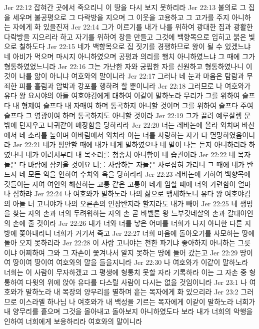 Jer 22:12  잡혀간 곳에서 죽으리니 이 땅을 다시 보지 못하리라
Jer 22:13  불의로 그 집을 세우며 불공평으로 그 다락방을 지으며 그 이웃을 고용하고 그 고가를 주지 아니하는 자에게 화 있을진저
Jer 22:14  그가 이르기를 내가 나를 위하여 광대한 집과 광활한 다락방을 지으리라 하고 자기를 위하여 창을 만들고 그것에 백향목으로 입히고 붉은 빛으로 칠하도다
Jer 22:15  네가 백향목으로 집 짓기를 경쟁하므로 왕이 될 수 있겠느냐 네 아비가 먹으며 마시지 아니하였으며 공평과 의리를 행치 아니하였느냐 그 때에 그가 형통하였었느니라
Jer 22:16  그는 가난한 자와 궁핍한 자를 신원하고 형통하였나니 이것이 나를 앎이 아니냐 여호와의 말이니라
Jer 22:17  그러나 네 눈과 마음은 탐람과 무죄한 피를 흘림과 압박과 강포를 행하려 할 뿐이니라
Jer 22:18  그러므로 나 여호와가 유다 왕 요시야의 아들 여호야김에게 대하여 이같이 말하노라 무리가 그를 위하여 슬프다 내 형제여 슬프다 내 자매여 하며 통곡하지 아니할 것이며 그를 위하여 슬프다 주여 슬프다 그 영광이여 하며 통곡하지도 아니할 것이라
Jer 22:19  그가 끌려 예루살렘 문 밖에 던지우고 나귀같이 매장함을 당하리라
Jer 22:20  너는 레바논에 올라 외치며 바산에서 네 소리를 높이며 아바림에서 외치라 이는 너를 사랑하는 자가 다 멸망하였음이니라
Jer 22:21  네가 평안할 때에 내가 네게 말하였으나 네 말이 나는 듣지 아니하리라 하였나니 네가 어려서부터 내 목소리를 청종치 아니함이 네 습관이라
Jer 22:22  네 목자들은 다 바람에 삼키울 것이요 너를 사랑하는 자들은 사로잡혀 가리니 그 때에 네가 반드시 네 모든 악을 인하여 수치와 욕을 당하리라
Jer 22:23  레바논에 거하여 백향목에 깃들이는 자여 여인의 해산하는 고통 같은 고통이 네게 임할 때에 너의 가련함이 얼마나 심하랴
Jer 22:24  나 여호와가 말하노라 나의 삶으로 맹세하노니 유다 왕 여호야김의 아들 너 고니야가 나의 오른손의 인장반지라 할지라도 내가 빼어
Jer 22:25  네 생명을 찾는 자의 손과 너의 두려워하는 자의 손 곧 바벨론 왕 느부갓네살의 손과 갈대아인의 손에 줄 것이라
Jer 22:26  내가 너와 너를 낳은 어미를 너희가 나지 아니한 다른 지방에 쫓아내리니 너희가 거기서 죽고
Jer 22:27  너희 마음에 돌아오기를 사모하는 땅에 돌아 오지 못하리라
Jer 22:28  이 사람 고니야는 천한 파기냐 좋아하지 아니하는 그릇이냐 어찌하여 그와 그 자손이 쫓겨나서 알지 못하는 땅에 들어 갔는고
Jer 22:29  땅이여 땅이여 땅이여 여호와의 말을 들을지니라
Jer 22:30  나 여호와가 이같이 말하노라 너희는 이 사람이 무자하겠고 그 평생에 형통치 못할 자라 기록하라 이는 그 자손 중 형통하여 다윗의 위에 앉아 유다를 다스릴 사람이 다시는 없을 것임이니라
Jer 23:1  나 여호와가 말하노라 내 목장의 양무리를 멸하며 흩는 목자에게 화 있으리라
Jer 23:2  그러므로 이스라엘 하나님 나 여호와가 내 백성을 기르는 목자에게 이같이 말하노라 너희가 내 양무리를 흩으며 그것을 몰아내고 돌아보지 아니하였도다 보라 내가 너희의 악행을 인하여 너희에게 보응하리라 여호와의 말이니라
